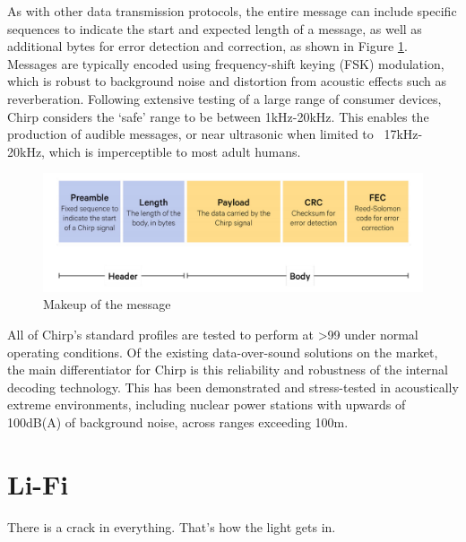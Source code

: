 \documentclass[notitlepage]{article}
\begin{document}
As with other data transmission protocols, the entire message can include
specific sequences to indicate the start and expected length of a message, as
well as additional bytes for error detection and correction, as shown in Figure
\ref{fig:dos_message}. Messages are typically encoded using frequency-shift
keying (FSK) modulation, which is robust to background noise and distortion
from acoustic effects such as reverberation. Following extensive testing of a
large range of consumer devices, Chirp considers the ‘safe’ range to be between
1kHz-20kHz. This enables the production of audible messages, or near ultrasonic
when limited to ~17kHz-20kHz, which is imperceptible to most adult humans. 

\begin{figure}[!h]
  \includegraphics[width=\linewidth]{res/dos_message.png}
    \caption{Makeup of the message}
  \label{fig:dos_message}
\end{figure}

All of Chirp’s standard profiles are tested to perform at >99%
under normal operating conditions. Of the existing data-over-sound solutions
on the market, the main differentiator for Chirp is this reliability and
robustness of the internal decoding technology. This has been demonstrated and
stress-tested in acoustically extreme environments, including nuclear power
stations with upwards of 100dB(A) of background noise, across ranges exceeding
100m.

\nocite{chirp17}
\printbibliography[heading=subbibliography]




\newpage
\section{Li-Fi}

\epigraph{There is a crack in everything.
That's how the light gets in.}{\parencite{selected-poem}}


\end{document}
